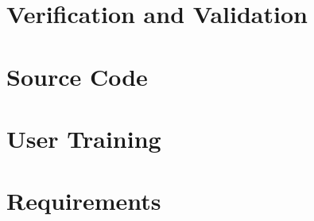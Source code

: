 \documentclass{simcenterdocumentation}
\begin{document}
\chapter{Verification and Validation}
\label{chap:vnv}


\chapter{Source Code}
\label{chap:SourceCode}


\chapter{User Training}
\label{chap:training}


\chapter{Requirements}
\label{chap:requirements}


\nocite{*}


\pagestyle{plain}
{
  \renewcommand{\thispagestyle}[1]{}	
  \printbibliography           
}
\end{document}
